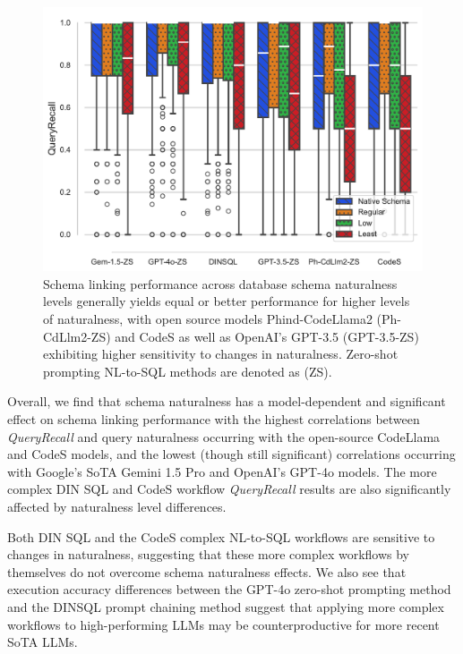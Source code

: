 \begin{figure}
  \centering
  \includegraphics[width=\figwidthmod\linewidth]{figures/recall-boxplot-db-combined.pdf}
  \caption{Schema linking performance across database schema naturalness levels generally yields equal or better performance for higher levels of naturalness, with open source models Phind-CodeLlama2 (Ph-CdLlm2-ZS) and CodeS as well as OpenAI's GPT-3.5 (GPT-3.5-ZS) exhibiting higher sensitivity to changes in naturalness. Zero-shot prompting NL-to-SQL methods are denoted as (ZS).}
  \label{fig:modelrecallnaturalnesslevels}
\end{figure}


Overall, we find that schema naturalness has a model-dependent and significant effect on schema linking performance with the highest correlations between \emph{QueryRecall} and query naturalness occurring with the open-source CodeLlama and CodeS models, and the lowest (though still significant) correlations occurring with Google's SoTA Gemini 1.5 Pro and OpenAI's GPT-4o models.
The more complex DIN SQL and CodeS workflow \emph{QueryRecall} results are also significantly affected by naturalness level differences.

Both DIN SQL and the CodeS complex NL-to-SQL workflows are sensitive to changes in naturalness, suggesting that these more complex workflows by themselves do not overcome schema naturalness effects.  
We also see that execution accuracy differences between the GPT-4o zero-shot prompting method and the DINSQL prompt chaining method suggest that applying more complex workflows to high-performing LLMs may be counterproductive for more recent SoTA LLMs.

